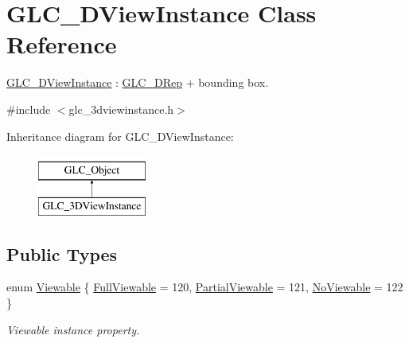 \hypertarget{class_g_l_c__3_d_view_instance}{\section{G\-L\-C\-\_\-D\-View\-Instance Class Reference}
\label{class_g_l_c__3_d_view_instance}
}


\hyperlink{class_g_l_c__3_d_view_instance}{G\-L\-C\-\_\-D\-View\-Instance} \-: \hyperlink{class_g_l_c__3_d_rep}{G\-L\-C\-\_\-D\-Rep} + bounding box.  




{\ttfamily \#include $<$glc\-\_\-3dviewinstance.\-h$>$}

Inheritance diagram for G\-L\-C\-\_\-D\-View\-Instance\-:\begin{figure}[H]
\begin{center}
\leavevmode
\includegraphics[height=2.000000cm]{class_g_l_c__3_d_view_instance}
\end{center}
\end{figure}
\subsection*{Public Types}
\begin{DoxyCompactItemize}
\item 
enum \hyperlink{class_g_l_c__3_d_view_instance_a34f78b0d3fce3d0325b4538d707c5d2b}{Viewable} \{ \hyperlink{class_g_l_c__3_d_view_instance_a34f78b0d3fce3d0325b4538d707c5d2bade38d741764b539c95483626d141238c}{Full\-Viewable} = 120, 
\hyperlink{class_g_l_c__3_d_view_instance_a34f78b0d3fce3d0325b4538d707c5d2baaa3150d11ec22652e6b60de0e4a1f473}{Partial\-Viewable} = 121, 
\hyperlink{class_g_l_c__3_d_view_instance_a34f78b0d3fce3d0325b4538d707c5d2ba13ddfb5c74ee51765544037fe89a316d}{No\-Viewable} = 122
 \}
\begin{DoxyCompactList}\small\item\em Viewable instance property. \end{DoxyCompactList}\end{DoxyCompactItemize}
